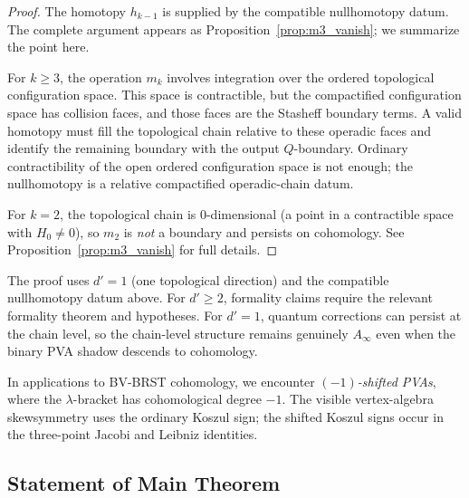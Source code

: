 \begin{proof}
The homotopy $h_{k-1}$ is supplied by the compatible
nullhomotopy datum. The complete argument appears as
Proposition~\ref{prop:m3_vanish}; we summarize the point here.

For $k \geq 3$, the operation $m_k$ involves integration over the
ordered topological configuration space. This space is contractible,
but the compactified configuration space has collision faces, and
those faces are the Stasheff boundary terms. A valid homotopy must
fill the topological chain relative to these operadic faces and
identify the remaining boundary with the output $Q$-boundary.
Ordinary contractibility of the open ordered configuration space is
not enough; the nullhomotopy is a relative compactified
operadic-chain datum.

For $k=2$, the topological chain is $0$-dimensional (a point in a
contractible space with $H_0 \neq 0$), so $m_2$ is \emph{not} a
boundary and persists on cohomology. See
Proposition~\ref{prop:m3_vanish} for full details.
\end{proof}

\begin{remark}[Formality fails for $d'=1$]
The proof uses $d' = 1$ (one topological direction) and the compatible
nullhomotopy datum above. For $d' \geq 2$, formality claims require
the relevant formality theorem and hypotheses. For $d' = 1$, quantum
corrections can persist at the chain level, so the chain-level
structure remains genuinely $A_\infty$ even when the binary PVA shadow
descends to cohomology.
\end{remark}


\begin{remark}
In applications to BV-BRST cohomology, we encounter
\emph{$(-1)$-shifted PVAs}, where the $\lambda$-bracket has
cohomological degree $-1$. The visible vertex-algebra skewsymmetry
uses the ordinary Koszul sign; the shifted Koszul signs occur in the
three-point Jacobi and Leibniz identities.
\end{remark}

\subsection{Statement of Main Theorem}


